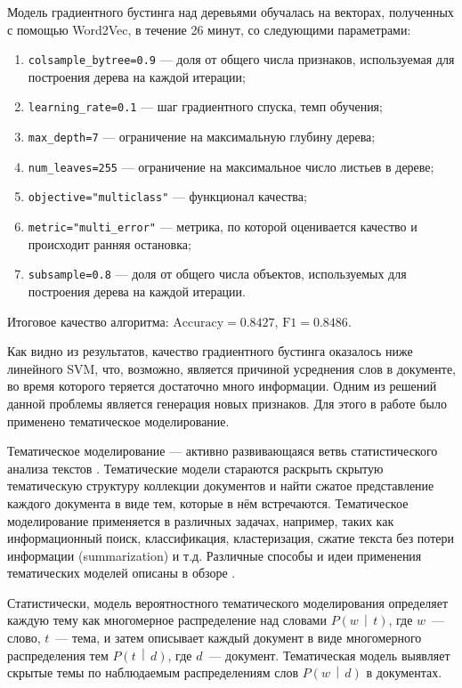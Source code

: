 \documentclass[a4paper, 14pt]{extarticle}
\begin{document}
Модель градиентного бустинга над деревьями обучалась на векторах, полученных с помощью Word2Vec, в течение 26 минут, со следующими параметрами:
\begin{enumerate}
	\item \verb|colsample_bytree=0.9| --- доля от общего числа признаков, используемая для построения дерева на каждой итерации;
	\item \verb|learning_rate=0.1| --- шаг градиентного спуска, темп обучения;
	\item \verb|max_depth=7| --- ограничение на максимальную глубину дерева;
	\item \verb|num_leaves=255| --- ограничение на максимальное число листьев в дереве;
	\item \verb|objective="multiclass"| --- функционал качества;
	\item \verb|metric="multi_error"| --- метрика, по которой оценивается качество и происходит ранняя остановка;
	\item \verb|subsample=0.8| --- доля от общего числа объектов, используемых для построения дерева на каждой итерации.
\end{enumerate}
Итоговое качество алгоритма: $\text{Accuracy} = 0.8427$, $\text{F1} = 0.8486$.

Как видно из результатов, качество градиентного бустинга оказалось ниже линейного SVM, что, возможно, является причиной усреднения слов в документе,
во время которого теряется достаточно много информации. Одним из решений данной проблемы является генерация новых признаков. Для этого 
в работе было применено тематическое моделирование.

Тематическое моделирование --- активно развивающаяся ветвь статистического анализа текстов \cite{Blei:2012:PTM:2133806.2133826}. Тематические
модели стараются раскрыть скрытую тематическую структуру коллекции документов и найти сжатое представление каждого документа в виде
тем, которые в нём встречаются. Тематическое моделирование применяется в различных задачах, например, таких как информационный поиск,
классификация, кластеризация, сжатие текста без потери информации (summarization) и т.д. Различные способы и идеи применения тематических моделей
описаны в обзоре \cite{Daud2010}.

Статистически, модель вероятностного тематического моделирования определяет каждую тему как многомерное распределение над словами
$P\left(w \,\middle|\, t\right)$, где $w$~--- слово, $t$~--- тема, и затем описывает каждый документ в виде многомерного распределения тем $P\left(t \,\middle|\, d\right)$, где $d$~--- документ. Тематическая модель выявляет скрытые темы по наблюдаемым распределениям слов 
$P\left(w \,\middle|\, d\right)$ в документах.
\end{document}
